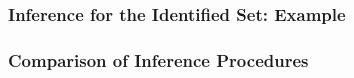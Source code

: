 \documentclass[10pt,letterpaper]{beamer}
\begin{document}
\begin{frame}
\frametitle{Inference for the Identified Set: Example}

\begin{figure}[h!]
\begin{center}
\end{center}
\end{figure}	
\end{frame}
\begin{frame}
\frametitle{Comparison of Inference Procedures}

\begin{figure}[h!]
\begin{center}
\end{center}
\end{figure}	
\end{frame}
\end{document}
